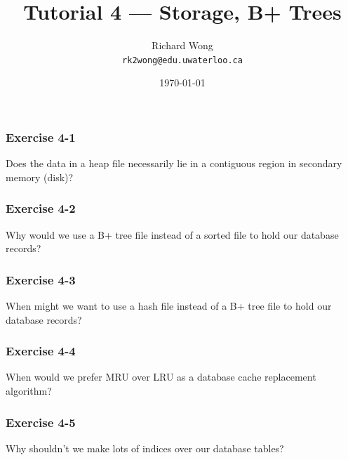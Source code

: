 

\title{Tutorial 4 --- Storage, B+ Trees}

\author{Richard Wong \\ \small \texttt{rk2wong@edu.uwaterloo.ca}}
\date{\today}




\begin{frame}
  \titlepage

\end{frame}


\begin{frame}
\frametitle{Exercise 4-1}

Does the data in a heap file necessarily lie in a contiguous region in secondary memory (disk)?

\end{frame}


\begin{frame}
\frametitle{Exercise 4-2}

Why would we use a B+ tree file instead of a sorted file to hold our database records?

\end{frame}


\begin{frame}
\frametitle{Exercise 4-3}

When might we want to use a hash file instead of a B+ tree file to hold our database records?

\end{frame}


\begin{frame}
\frametitle{Exercise 4-4}

When would we prefer MRU over LRU as a database cache replacement algorithm?

\end{frame}


\begin{frame}
\frametitle{Exercise 4-5}

Why shouldn't we make lots of indices over our database tables?

\end{frame}


